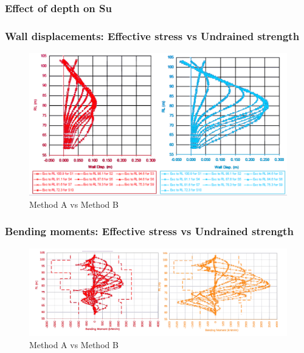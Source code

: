 \documentclass[notes]{beamer}
\begin{document}
\begin{frame}
	\frametitle{Effect of depth on Su}
\end{frame}

\begin{frame}
\frametitle{Wall displacements: Effective stress vs Undrained strength}
\begin{figure}[ht]
	\centering
	\includegraphics[width=\textwidth]{figs/wall-disp.png}
	\caption*{Method A vs Method B}
\end{figure}
\end{frame}

\begin{frame}
\frametitle{Bending moments: Effective stress vs Undrained strength}
	\begin{figure}[ht]
		\centering
		\includegraphics[width=\textwidth]{figs/bending-moments.png}
		\caption*{Method A vs Method B}
	\end{figure}
\end{frame}
\end{document}
